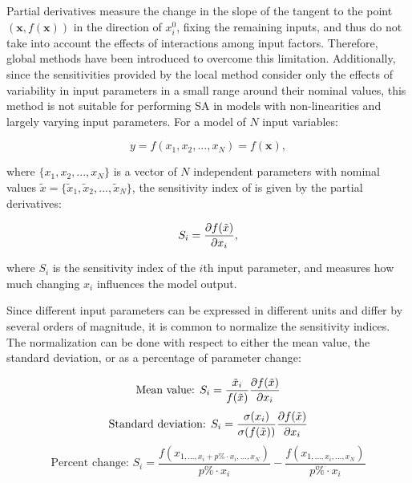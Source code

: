 \documentclass[12pt]{article}
\begin{document}
Partial derivatives measure the change in the slope of the tangent to the point $(\mathbf{x},f(\mathbf{x}))$ in the direction of $x^{0}_{i}$, fixing the remaining inputs, and thus do not take into account the effects of interactions among input factors. Therefore, global methods have been introduced to overcome this limitation.  
Additionally, since the sensitivities provided by the local method consider only the effects of variability in input parameters in a small range around their nominal values, this method is not suitable for performing SA in models with non-linearities and largely varying input parameters.
For a model of $N$ input variables:

\begin{equation}
  y=f(x_{1}, x_{2}, ..., x_{N})=f(\mathbf{x}),
\end{equation}

where $\{x_{1}, x_{2}, ..., x_{N}\}$ is a vector of $N$ independent parameters with nominal values $\tilde x=\{\tilde x_{1},\tilde x_{2}, ...,\tilde x_{N}\}$, the sensitivity index of  is given by the partial derivatives:

\begin{equation}
  S_{i}=\pdv{f(\tilde x)}{x_{i}}, %
\end{equation}

where $S_{i}$ is the sensitivity index of the $i$th input parameter, and measures how much changing $x_{i}$ influences the model output.

Since different input parameters can be expressed in different units and differ by several orders of magnitude, it is common to normalize the sensitivity indices. The normalization can be done with respect to either the mean value, the standard deviation, or as a percentage of parameter change:

\begin{equation}
\text{Mean value: }S_{i}=\frac{\tilde x_{i}}{f(\tilde x)}\pdv{f(\tilde x)}{x_{i}} %
\end{equation}
\begin{equation}
\text{Standard deviation: }S_{i}=\frac{\sigma(x_{i})}{\sigma(f(\tilde x))}\pdv{f(\tilde x)}{x_{i}} %
\end{equation}
\begin{equation}
\text{Percent change: }S_{i}=\frac{f(x_{1,...,x_{i}+p\%\cdot x_{i},...,x_{N}})}{p\%\cdot x_{i}}-\frac{f(x_{1,...,x_{i},...,x_{N}})}{p\%\cdot x_{i}}
\end{equation}
\end{document}
